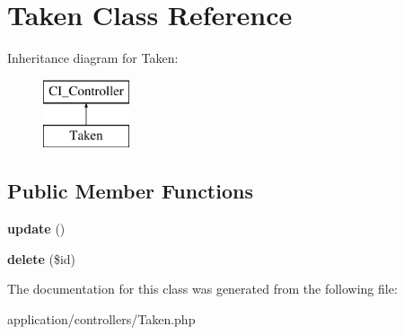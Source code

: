 \hypertarget{class_taken}{}\section{Taken Class Reference}
\label{class_taken}
Inheritance diagram for Taken\+:\begin{figure}[H]
\begin{center}
\leavevmode
\includegraphics[height=2.000000cm]{class_taken}
\end{center}
\end{figure}
\subsection*{Public Member Functions}
\begin{DoxyCompactItemize}
\item 
\mbox{\label{class_taken_a842e4774e3b3601a005b995c02f7e883}} 
{\bfseries update} ()
\item 
\mbox{\label{class_taken_a2f8258add505482d7f00ea26493a5723}} 
{\bfseries delete} (\$id)
\end{DoxyCompactItemize}


The documentation for this class was generated from the following file\+:\begin{DoxyCompactItemize}
\item 
application/controllers/Taken.\+php\end{DoxyCompactItemize}
